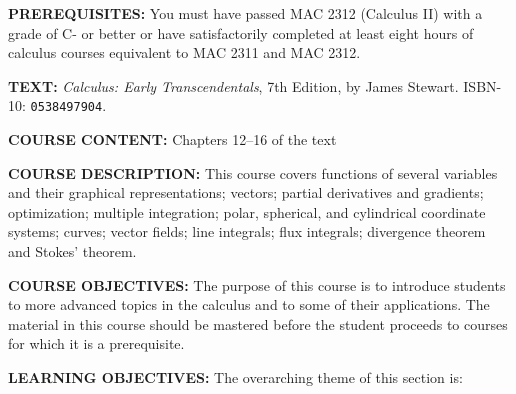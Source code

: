 \documentclass[12pt,oneside]{amsart}
\begin{document}
\noindent \textbf{PREREQUISITES:} You must have passed MAC 2312 (Calculus II) with a grade of C- or better or have satisfactorily completed at least eight hours of
calculus courses equivalent to MAC 2311 and MAC 2312.

\noindent \textbf{TEXT:} \textit{Calculus: Early Transcendentals}, 7th Edition, by
James Stewart. ISBN-10: \texttt{0538497904}.

\noindent \textbf{COURSE CONTENT:} Chapters 12--16 of the text

\noindent \textbf{COURSE DESCRIPTION:} This course covers functions of several variables and their graphical representations; vectors; partial derivatives and gradients; optimization; multiple integration; polar, spherical, and cylindrical coordinate systems; curves; vector fields; line integrals; flux integrals; divergence theorem and Stokes' theorem.  

\noindent \textbf{COURSE OBJECTIVES:} The purpose of this course is to introduce students to more advanced topics in the calculus and to some of their applications. The material in this course should be mastered before the student proceeds to courses for which it is a prerequisite.

\noindent \textbf{LEARNING OBJECTIVES:} The overarching theme of this section is:\vspace{-3mm}\begin{center}\end{center}\vspace{-1.5mm}
\end{document}
